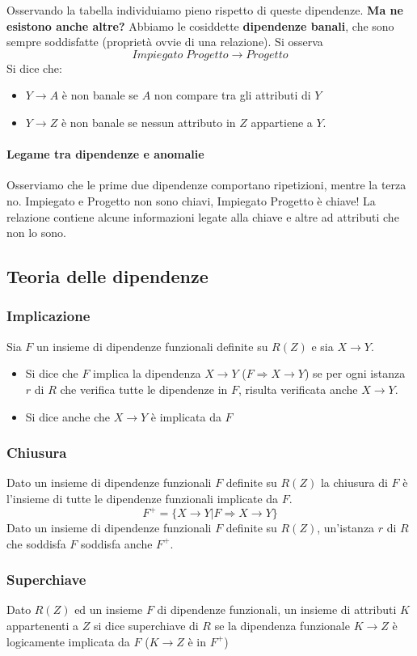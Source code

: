 Osservando la tabella individuiamo pieno rispetto di queste dipendenze. \textbf{Ma ne esistono anche altre?} Abbiamo le cosiddette \textbf{dipendenze banali}, che sono sempre soddisfatte (proprietà ovvie di una relazione). Si osserva 
\[Impiegato\;Progetto \longrightarrow Progetto\]
Si dice che:
\begin{itemize}
	\item $Y \to A$ è non banale se $A$ non compare tra gli attributi di $Y$
	\item $Y \to Z$ è non banale se nessun attributo in $Z$ appartiene a $Y$.
\end{itemize}
\paragraph{Legame tra dipendenze e anomalie} Osserviamo che le prime due dipendenze comportano ripetizioni, mentre la terza no. Impiegato e Progetto non sono chiavi, Impiegato Progetto è chiave! La relazione contiene alcune informazioni legate alla chiave e altre ad attributi che non lo sono.

\subsection{Teoria delle dipendenze}
\subsubsection{Implicazione}
Sia $F$ un insieme di dipendenze funzionali definite su $R(Z)$ e sia $X \longrightarrow Y$.
\begin{itemize}
	\item Si dice che $F$ implica la dipendenza $X \to Y$ ($F \Rightarrow X \to Y$) se per ogni istanza $r$ di $R$ che verifica tutte le dipendenze in $F$, risulta verificata anche $X \to Y$.
	\item Si dice anche che $X \to Y$ è implicata da $F$
\end{itemize}
\subsubsection{Chiusura}
Dato un insieme di dipendenze funzionali $F$ definite su $R(Z)$ la chiusura di $F$ è l'insieme di tutte le dipendenze funzionali implicate da $F$.
\[F^{+}=\{X \to Y | F \Rightarrow X \to Y\}\]
Dato un insieme di dipendenze funzionali $F$ definite su $R(Z)$, un'istanza $r$ di $R$ che soddisfa $F$ soddisfa anche $F^{+}$.
\subsubsection{Superchiave}
Dato $R(Z)$ ed un insieme $F$ di dipendenze funzionali, un insieme di attributi $K$ appartenenti a $Z$ si dice superchiave di $R$ se la dipendenza funzionale $K \to Z$ è logicamente implicata da $F$ ($K\to Z$ è in $F^{+}$)
